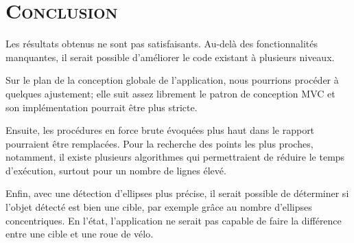 \documentclass[a4paper, 11pt]{article}
\begin{document}
\bigskip
\bigskip

\section*{\color{unilim_red}\textsc{Conclusion}}
\par
Les résultats obtenus ne sont pas satisfaisants. Au-delà des fonctionnalités manquantes, il serait possible d'améliorer le code existant à plusieurs niveaux.
\par
Sur le plan de la conception globale de l'application, nous pourrions procéder à quelques ajustement; elle suit assez librement le patron de conception MVC et son implémentation pourrait être plus stricte.
\par
Ensuite, les procédures en \og force brute \fg{} évoquées plus haut dans le rapport pourraient être remplacées. Pour la recherche des points les plus proches, notamment, il existe plusieurs algorithmes qui permettraient de réduire le temps d'exécution, surtout pour un nombre de lignes élevé.
\par
Enfin, avec une détection d'ellipses plus précise, il serait possible de déterminer si l'objet détecté est bien une cible, par exemple grâce au nombre d'ellipses concentriques. En l'état, l'application ne serait pas capable de faire la différence entre une cible et une roue de vélo.

\clearpage

%
%
  
\nocite{*}


\end{document}
